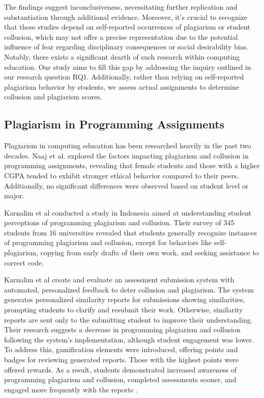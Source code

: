 The findings suggest inconclusiveness, necessitating further replication and substantiation through additional evidence. Moreover, it's crucial to recognize that these studies depend on self-reported occurrences of plagiarism or student collusion, which may not offer a precise representation due to the potential influence of fear regarding disciplinary consequences or social desirability bias. Notably, there exists a significant dearth of such research within computing education. Our study aims to fill this gap by addressing the inquiry outlined in our research question RQ1. Additionally, rather than relying on self-reported plagiarism behavior by students, we assess actual assignments to determine collusion and plagiarism scores.

\subsection{Plagiarism in Programming Assignments}
Plagiarism in computing education has been researched heavily in the past two decades. Naaj et al. \cite{8937362} explored the factors impacting plagiarism and collusion in programming assignments, revealing that female students and those with a higher CGPA tended to exhibit stronger ethical behavior compared to their peers. Additionally, no significant differences were observed based on student level or major. 

Karnalim et al \cite{9678917} conducted a study in Indonesia aimed at understanding student perceptions of programming plagiarism and collusion. Their survey of 345 students from 16 universities revealed that students generally recognize instances of programming plagiarism and collusion, except for behaviors like self-plagiarism, copying from early drafts of their own work, and seeking assistance to correct code. 

Karnalim et al \cite{10.1145/3506717} create and evaluate an assessment submission system with automated, personalized feedback to deter collusion and plagiarism. The system generates personalized similarity reports for submissions showing similarities, prompting students to clarify and resubmit their work. Otherwise, similarity reports are sent only to the submitting student to improve their understanding. Their research suggests a decrease in programming plagiarism and collusion following the system's implementation, although student engagement was lower. To address this, gamification elements were introduced, offering points and badges for reviewing generated reports. Those with the highest points were offered rewards. As a result, students demonstrated increased awareness of programming plagiarism and collusion, completed assessments sooner, and engaged more frequently with the reports \cite{10042043}.

